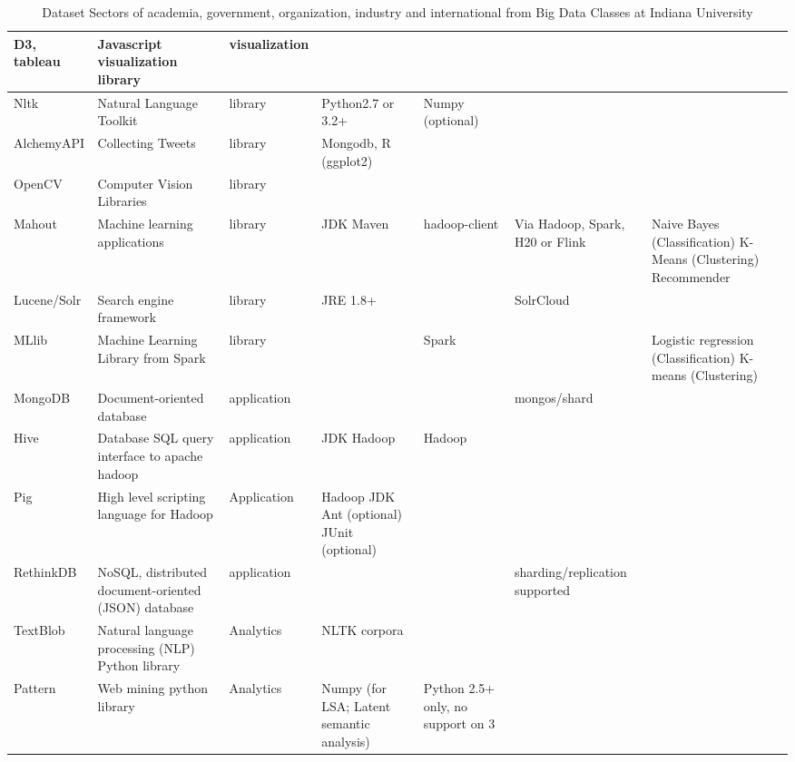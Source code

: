 \documentclass[9pt,twocolumn,twoside]{styles/osajnl}
\begin{document}
\begin{table}[htb]
\begin{center}
\begin{small}
\begin{tabular}{l|l|l|l|l|l|l}
	D3, tableau &  Javascript visualization library & visualization & &  & &  \\ \hline
	Nltk & Natural Language Toolkit & library & Python2.7 or 3.2+ & Numpy (optional) & 	 & \\ \hline
	AlchemyAPI & Collecting Tweets & library & Mongodb, R (ggplot2) & 	 &  & \\ \hline
	OpenCV & Computer Vision Libraries & library &  & &  &  \\ \hline
	Mahout & Machine learning applications & library & JDK Maven & hadoop-client & Via Hadoop, Spark, H20 or Flink & Naive Bayes (Classification) K-Means (Clustering) Recommender \\ \hline
	Lucene/Solr & Search engine framework & library & JRE 1.8+ & 	 & SolrCloud & 	 \\ \hline
	MLlib & Machine Learning Library from Spark & library & & Spark & & Logistic regression (Classification) K-means (Clustering) \\ \hline
	MongoDB & Document-oriented database & application & & & mongos/shard & \\ \hline
	Hive & Database SQL query interface to apache hadoop & application & JDK  Hadoop & 	Hadoop &  &  \\ \hline
	Pig & High level scripting language for Hadoop & Application & 	Hadoop JDK Ant (optional) JUnit (optional) &  & & \\ \hline
	RethinkDB & NoSQL, distributed document-oriented (JSON) database & application &  & & sharding/replication supported & \\ \hline
	TextBlob & Natural language processing (NLP) Python library & 	Analytics & 	NLTK corpora & & & \\ \hliine
	Pattern & Web mining python library & 	Analytics & 	Numpy (for LSA; Latent semantic analysis) & 	Python 2.5+ only, no support on 3 &  & \\ \hline




      \end{tabular}
      \caption{Dataset Sectors of academia, government, organization,
        industry and international from Big Data Classes at Indiana
        University}
      \label{tab:dataset-sector-iu}
    \end{small}
  \end{center}
\end{table}


	

	
\end{document}

